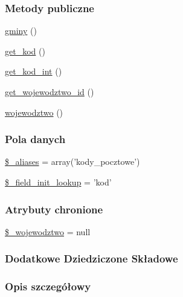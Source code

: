 \subsubsection*{Metody publiczne}
\begin{DoxyCompactItemize}
\item 
\hyperlink{classep___kod___pocztowy_a885f04b428d85dab7d92552ae9dba979}{gminy} ()
\item 
\hyperlink{classep___kod___pocztowy_a013f0dbe044fb129e4ddd98598b4e34a}{get\-\_\-kod} ()
\item 
\hyperlink{classep___kod___pocztowy_a7707101ef5dc05d7b439e7d08f1c3d10}{get\-\_\-kod\-\_\-int} ()
\item 
\hyperlink{classep___kod___pocztowy_a36399d80f5ab76bb2d958a481f9002ff}{get\-\_\-wojewodztwo\-\_\-id} ()
\item 
\hyperlink{classep___kod___pocztowy_a2c735142a4af50d47b17d8103a9ab9ab}{wojewodztwo} ()
\end{DoxyCompactItemize}
\subsubsection*{Pola danych}
\begin{DoxyCompactItemize}
\item 
\hyperlink{classep___kod___pocztowy_ab4e31d75f0bc5d512456911e5d01366b}{\$\-\_\-aliases} = array('kody\-\_\-pocztowe')
\item 
\hyperlink{classep___kod___pocztowy_a4a4d54ae35428077a7c61ec8a5139af3}{\$\-\_\-field\-\_\-init\-\_\-lookup} = 'kod'
\end{DoxyCompactItemize}
\subsubsection*{Atrybuty chronione}
\begin{DoxyCompactItemize}
\item 
\hyperlink{classep___kod___pocztowy_a2a0a830e555a9e31b5118be82dbc33c7}{\$\-\_\-wojewodztwo} = null
\end{DoxyCompactItemize}
\subsubsection*{Dodatkowe Dziedziczone Składowe}


\subsubsection{Opis szczegółowy}



